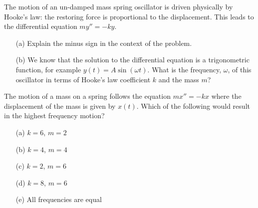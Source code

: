 \begin{problem}
    The motion of an un-damped mass spring oscillator is driven physically by Hooke's law:
    the restoring force is proportional to the displacement.  This leads to the
    differential equation $my'' = -ky$.  
    \begin{enumerate}
        \item[(a)] Explain the minus sign in the context of the problem.
        \item[(b)] We know that the solution to the differential equation is a
            trigonometric function, for example $y(t) = A \sin(\omega t)$.  What is the
            frequency, $\omega$, of this oscillator in terms of Hooke's law coefficient
            $k$ and the mass $m$?
    \end{enumerate}
\end{problem}

\begin{problem}
    The motion of a mass on a spring follows the equation $m x'' = -k x$ where the
    displacement of the mass is given by $x(t)$.  Which of the following would result in
    the highest frequency motion?
\begin{enumerate}
    \item[(a)] $k = 6$, $m=2$
    \item[(b)] $k=4$, $m=4$
    \item[(c)] $k=2$, $m=6$
    \item[(d)] $k = 8$, $m = 6$
    \item[(e)] All frequencies are equal
\end{enumerate}
\end{problem}
%             


%             


